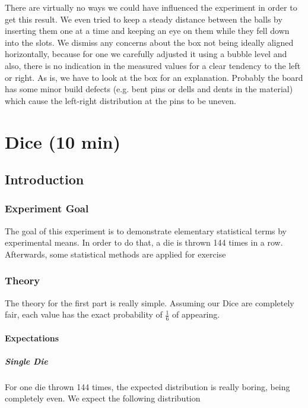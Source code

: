 \documentclass{scrreprt}
\begin{document}
There are virtually no ways we could have influenced the experiment in order to get this result. We even tried to keep a steady distance between the balls by inserting them one at a time and keeping an eye on them while they fell down into the slots. We dismiss any concerns about the box not being ideally aligned horizontally, because for one we carefully adjusted it using a bubble level and also, there is no indication in the measured values for a clear tendency to the left or right. As is, we have to look at the box for an explanation. Probably the board has some minor build defects (e.g. bent pins or dells and dents in the material) which cause the left-right distribution at the pins to be uneven.


\chapter[Dice]{Dice (10 min)}

\section{Introduction}

\subsection{Experiment Goal}
The goal of this experiment is to demonstrate elementary statistical terms by experimental means. In order to do that, a die is thrown 144 times in a row. Afterwards, some statistical methods are applied for exercise

\subsection{Theory}
The theory for the first part is really simple. Assuming our Dice are completely fair, each value has the exact probability of $\frac{1}{6}$ of appearing.
 
\subsubsection{Expectations}

\paragraph{Single Die}
For one die thrown 144 times, the expected distribution is really boring, being completely even. We expect the following distribution
\end{document}
